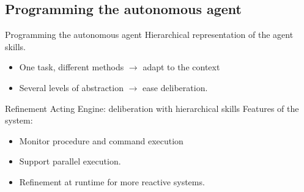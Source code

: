 \subsection{Programming the autonomous agent}

\begin{frame}{Programming the autonomous agent}
    Hierarchical representation of the agent skills.
    \begin{itemize}
        \item One task, different methods $\rightarrow$ adapt to the context
        \item Several levels of abstraction $\rightarrow$ ease deliberation.
    \end{itemize}
   
\end{frame}

\begin{frame}{Refinement Acting Engine: deliberation with hierarchical skills}
    Features of the system:
    \begin{itemize}
        \item Monitor procedure and command execution
        \item Support parallel execution.
        \item Refinement at runtime for more reactive systems.
    \end{itemize}
\end{frame}

